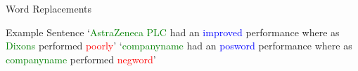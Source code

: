 \documentclass[10pt]{beamer}
\begin{document}
\begin{frame}[fragile]{Word Replacements}
\begin{block}{Example Sentence}
`\textcolor{green}{AstraZeneca PLC} had an \textcolor{blue}{improved} performance where as \textcolor{green}{Dixons} performed \textcolor{red}{poorly}'\newline\newline
`\textcolor{green}{companyname} had an \textcolor{blue}{posword} performance where as \textcolor{green}{companyname} performed \textcolor{red}{negword}'
\end{block}

\end{frame}
\end{document}
